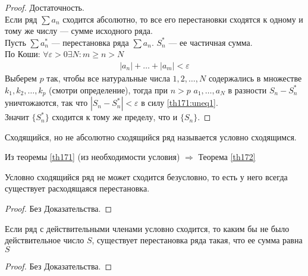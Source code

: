 \begin{proof}
  Достаточность. \\
  Если ряд $\sum a_n$ сходится абсолютно, то все его перестановки сходятся к
  одному и тому же числу --- сумме исходного ряда. \\
  Пусть $\sum a_n^*$ --- перестановка ряда $\sum a_n$. $S_n^*$ --- ее частичная
  сумма. \\
  По Коши: $\forall \varepsilon > 0 \exists N : m \geq n > N$
  \begin{gather}
    |a_n| + \dots + |a_m| < \varepsilon \label{th171:uneq1}
  \end{gather}
  Выберем $p$ так, чтобы все натуральные числа $1, 2, \dots, N$ содержались в
  множестве $k_1, k_2, \dots, k_p$ (смотри определение), тогда при $n > p$
  $a_1, \dots, a_N$ в разности $S_n - S_n^*$ уничтожаются, так что
  $|S_n - S_n^*| < \varepsilon$ в силу \eqref{th171:uneq1}. \\
  Значит $\{S_n^*\}$ сходится к тому же пределу, что и $\{S_n\}$.
\end{proof}

\begin{definition}
  Сходящийся, но не абсолютно сходящийся ряд называется условно сходящимся.
\end{definition}
Из теоремы \eqref{th171} (из необходимости условия) $\Rightarrow$ Теорема \eqref{th172}
\begin{theorem}
  \label{th172}
  Условно сходящийся ряд не может сходится безусловно, то есть у него всегда
  существует расходящаяся перестановка.
\end{theorem}
\begin{proof}
  Без Доказательства.
\end{proof}

\begin{theorem}[Римана]
  Если ряд с действительными членами условно сходится, то каким бы не было
  действительное число $S$, существует перестановка ряда такая, что ее сумма
  равна $S$
\end{theorem}

\begin{proof}
  Без Доказательства.
\end{proof}
